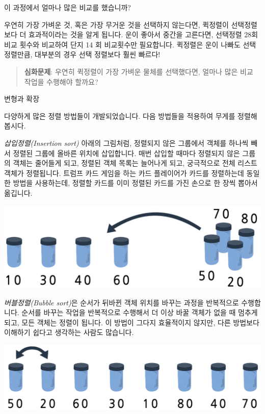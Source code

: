 \documentclass[]{article}
\begin{document}
이 과정에서 얼마나 많은 비교를 했습니까?

우연히 가장 가벼운 것, 혹은 가장 무거운 것을 선택하지 않는다면, 퀵정렬이
선택정렬보다 더 효과적이라는 것을 알게 됩니다. 운이 좋아서 중간을
고른다면, 선택정렬 28회 비교 횟수와 비교하여 단지 14 회 비교횟수만
필요합니다. 퀵정렬은 운이 나빠도 선택정렬만큼, 대부분의 경우 선택
정렬보다 훨씬 빠르다!

\begin{quote}
\textbf{심화문제}: 우연히 퀵정렬이 가장 가벼운 물체를 선택했다면, 얼마나
많은 비교 작업을 수행해야 할까요?
\end{quote}

변형과 확장

다양하게 많은 정렬 방법들이 개발되었습니다. 다음 방법들을 적용하여
무게를 정렬해봅시다.

\emph{삽입정렬(Insertion sort)} 아래의 그림처럼, 정렬되지 않은 그룹에서
객체를 하나씩 빼서 정렬된 그룹에 올바른 위치에 삽입합니다. 매번 삽입할
때마다 정렬되지 않은 그룹의 객체는 줄어들게 되고, 정렬된 객체 목록는
늘어나게 되고, 궁극적으로 전체 리스트 객체가 정렬됩니다. 트럼프 카드
게임을 하는 카드 플레이어가 카드를 정렬하는데 동일한 방법을 사용하는데,
정렬할 카드를 이미 정렬된 카드를 가진 손으로 한 장씩 뽑아서 옮깁니다.

\includegraphics{csunplugged/02-part/img/ch07-sort/07-sort-03-insertion.png}

\emph{버블정렬(Bubble sort)}은 순서가 뒤바뀐 객체 위치를 바꾸는 과정을
반복적으로 수행합니다. 순서를 바꾸는 작업을 반복적으로 수행해서 더 이상
바꿀 객체가 없을 때 멈추게 되고, 모든 객체는 정렬이 됩니다. 이 방법이
그다지 효율적이지 않지만, 다른 방법보다 이해하기 쉽다고 생각하는 사람도
많습니다.

\includegraphics{csunplugged/02-part/img/ch07-sort/07-sort-04-bubble.png}
\end{document}
